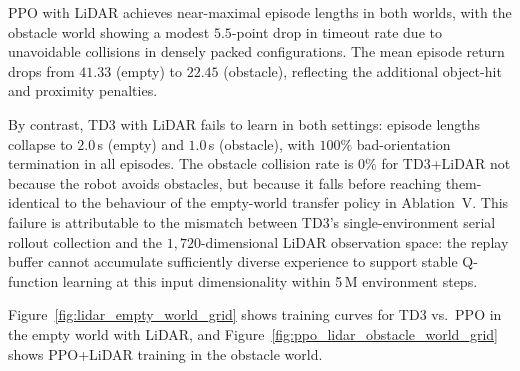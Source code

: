 \documentclass{article}
\begin{document}
PPO with LiDAR achieves near-maximal episode lengths in both worlds, with
the obstacle world showing a modest $5.5$-point drop in timeout rate due to
unavoidable collisions in densely packed configurations.
The mean episode return drops from $41.33$ (empty) to $22.45$ (obstacle),
reflecting the additional object-hit and proximity penalties.

By contrast, TD3 with LiDAR fails to learn in both settings: episode lengths
collapse to $2.0$\,s (empty) and $1.0$\,s (obstacle), with $100\%$
bad-orientation termination in all episodes.
The obstacle collision rate is $0\%$ for TD3+LiDAR not because the robot
avoids obstacles, but because it falls before reaching them-identical to the
behaviour of the empty-world transfer policy in Ablation~V.
This failure is attributable to the mismatch between TD3's single-environment
serial rollout collection and the $1{,}720$-dimensional LiDAR observation
space: the replay buffer cannot accumulate sufficiently diverse experience
to support stable Q-function learning at this input dimensionality within
5\,M environment steps.

Figure~\ref{fig:lidar_empty_world_grid} shows training curves for TD3 vs.\
PPO in the empty world with LiDAR, and
Figure~\ref{fig:ppo_lidar_obstacle_world_grid} shows PPO+LiDAR training in
the obstacle world.
\end{document}
